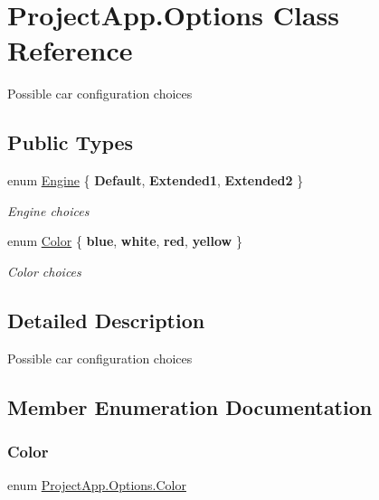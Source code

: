 \hypertarget{class_project_app_1_1_options}{}\section{Project\+App.\+Options Class Reference}
\label{class_project_app_1_1_options}


Possible car configuration choices  


\subsection*{Public Types}
\begin{DoxyCompactItemize}
\item 
enum \mbox{\hyperlink{class_project_app_1_1_options_a95e313182e8122da719f7c8caefcc88d}{Engine}} \{ {\bfseries Default}, 
{\bfseries Extended1}, 
{\bfseries Extended2}
 \}
\begin{DoxyCompactList}\small\item\em Engine choices \end{DoxyCompactList}\item 
enum \mbox{\hyperlink{class_project_app_1_1_options_aaa68b08af20deeebf73e6bc6de725c44}{Color}} \{ {\bfseries blue}, 
{\bfseries white}, 
{\bfseries red}, 
{\bfseries yellow}
 \}
\begin{DoxyCompactList}\small\item\em Color choices \end{DoxyCompactList}\end{DoxyCompactItemize}


\subsection{Detailed Description}
Possible car configuration choices 



\subsection{Member Enumeration Documentation}
\mbox{\label{class_project_app_1_1_options_aaa68b08af20deeebf73e6bc6de725c44}} 
\subsubsection{\texorpdfstring{Color}{Color}}
{\footnotesize\ttfamily enum \mbox{\hyperlink{class_project_app_1_1_options_aaa68b08af20deeebf73e6bc6de725c44}{Project\+App.\+Options.\+Color}}\hspace{0.3cm}{\ttfamily [strong]}}




